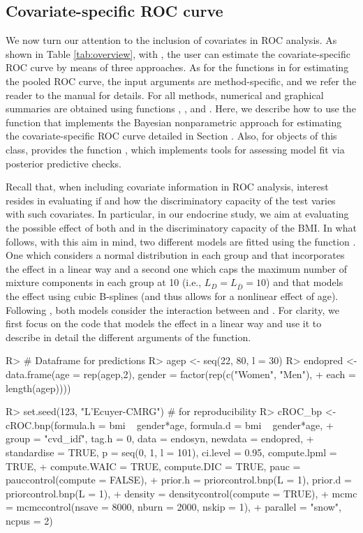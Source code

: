 \subsection{Covariate-specific ROC curve}\label{sec:croc_ilu}
We now turn our attention to the inclusion of covariates in ROC analysis. As shown in Table \ref{tab:overview}, with , the user can estimate the covariate-specific ROC curve by means of three approaches. As for the functions in  for estimating the pooled ROC curve, the input arguments are method-specific, and we refer the reader to the manual for details. For all methods, numerical and graphical summaries are obtained using functions , , and . Here, we describe how to use the function  that implements the Bayesian nonparametric approach for estimating the covariate-specific ROC curve detailed in Section . Also, for objects of this class,  provides the function , which implements tools for assessing model fit via posterior predictive checks.

Recall that, when including covariate information in ROC analysis, interest resides in evaluating if and how the discriminatory capacity of the test varies with such covariates. In particular, in our endocrine study, we aim at evaluating the possible effect of both  and  in the discriminatory capacity of the BMI. In what follows, with this aim in mind, two different models are fitted using the function . One which considers a normal distribution in each group and that incorporates the  effect in a linear way and a second one which caps the maximum number of mixture components in each group at 10 (i.e., $L_{D}=L_{\bar{D}}=10$) and that models the  effect using cubic B-splines (and thus allows for a nonlinear effect of age). Following \cite{MX11a,MX11b}, both models consider the interaction between  and . For clarity, we first focus on the code that models the  effect in a linear way and use it to describe in detail the different arguments of the  function.

\begin{example}
R> # Dataframe for predictions
R> agep <- seq(22, 80, l = 30)
R> endopred <- data.frame(age = rep(agep,2), gender = factor(rep(c("Women", "Men"), 
+ each = length(agep))))
		
R> set.seed(123, "L'Ecuyer-CMRG") # for reproducibility
R> cROC_bp <- cROC.bnp(formula.h = bmi ~ gender*age, formula.d = bmi ~ gender*age,
+ group = "cvd_idf", tag.h = 0, data = endosyn, newdata = endopred, 
+ standardise = TRUE, p = seq(0, 1, l = 101), ci.level = 0.95, compute.lpml = TRUE, 
+ compute.WAIC = TRUE, compute.DIC = TRUE, pauc = pauccontrol(compute = FALSE), 
+ prior.h = priorcontrol.bnp(L = 1), prior.d = priorcontrol.bnp(L = 1), 
+ density = densitycontrol(compute = TRUE),
+ mcmc = mcmccontrol(nsave = 8000, nburn = 2000, nskip = 1), 
+ parallel = "snow", ncpus = 2)
\end{example}

